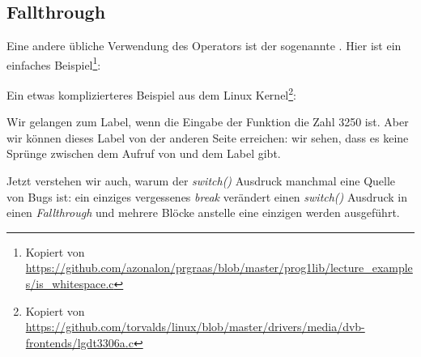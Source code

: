 \subsection{Fallthrough}
Eine andere übliche Verwendung des  Operators ist der sogenannte .
Hier ist ein einfaches Beispiel\footnote{Kopiert von
\url{https://github.com/azonalon/prgraas/blob/master/prog1lib/lecture_examples/is_whitespace.c}}:



Ein etwas komplizierteres Beispiel aus dem Linux Kernel\footnote{Kopiert von
\url{https://github.com/torvalds/linux/blob/master/drivers/media/dvb-frontends/lgdt3306a.c}}:




Wir gelangen zum  Label, wenn die Eingabe der Funktion die Zahl 3250 ist.
Aber wir können dieses Label von der anderen Seite erreichen: wir sehen, dass es keine Sprünge zwischen dem Aufruf von
\printf und dem  Label gibt.

Jetzt verstehen wir auch, warum der \emph{switch()} Ausdruck manchmal eine Quelle von Bugs ist:
ein einziges vergessenes \emph{break} verändert einen \emph{switch()} Ausdruck in einen \emph{Fallthrough} und mehrere Blöcke
anstelle eine einzigen werden ausgeführt.
